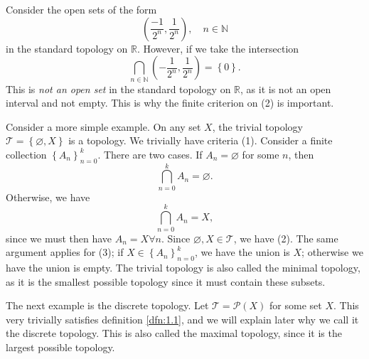 Consider the open sets of the form
\[
	\left( \frac{-1}{2^n},\frac{1}{2^n} \right) ,\quad n\in\mathbb{N}
\]
in the standard topology on $\mathbb{R}$. However, if we take the intersection
\[
	\bigcap_{n\in\mathbb{N}} \left( -\frac{1}{2^n},\frac{1}{2^n} \right) =\left\{ 0 \right\}  
.\]
This is \emph{not an open set} in the standard topology on $\mathbb{R}$, as it is not an open interval and not empty. This is why the finite criterion on (2) is important.

Consider a more simple example. On any set $X$, the trivial topology $\mathcal{T} =\left\{ \varnothing, X \right\} $ is a topology. We trivially have criteria (1). Consider a finite collection $\left\{ A_n \right\}_{n=0}^k$. There are two cases. If $A_n=\varnothing$ for some $n$, then
\[
	\bigcap_{n=0}^{k} A_n=\varnothing
.\]
Otherwise, we have
\[
	\bigcap_{n=0}^{k} A_n=X
,\]
since we must then have $A_n=X\forall n$. Since $\varnothing,X\in \mathcal{T} $, we have (2). The same argument applies for (3); if $X\in \left\{ A_n \right\}_{n=0}^k $, we have the union is $X$; otherwise we have the union is empty. The trivial topology is also called the minimal topology, as it is the smallest possible topology since it must contain these subsets. 

The next example is the discrete topology. Let $\mathcal{T} =\mathscr{P} (X)$ for some set $X$. This very trivially satisfies definition \ref{dfn:1.1}, and we will explain later why we call it the discrete topology. This is also called the maximal topology, since it is the largest possible topology.


